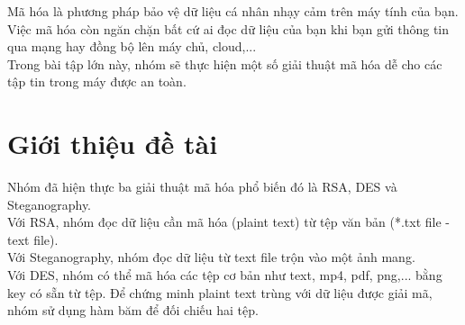 \documentclass[a4paper]{article}
\begin{document}

\newpage
\tableofcontents
\newpage

Mã hóa là phương pháp bảo vệ dữ liệu cá nhân nhạy cảm trên máy tính của bạn. Việc mã hóa còn ngăn chặn bất cứ ai đọc dữ liệu của bạn khi bạn gửi thông tin qua mạng hay đồng bộ lên máy chủ, cloud,...\\

Trong bài tập lớn này, nhóm sẽ thực hiện một số giải thuật mã hóa dễ cho các tập tin trong máy được an toàn.

\section{Giới thiệu đề tài}
Nhóm đã hiện thực ba giải thuật mã hóa phổ biến đó là RSA, DES và Steganography.\\

Với RSA, nhóm đọc dữ liệu cần mã hóa (plaint text) từ tệp văn bản (*.txt file - text file).\\
Với Steganography, nhóm đọc dữ liệu từ text file trộn vào một ảnh mang.\\
Với DES, nhóm có thể mã hóa các tệp cơ bản như text, mp4, pdf, png,... bằng key có sẵn từ tệp.
Để chứng minh plaint text trùng với dữ liệu được giải mã, nhóm sử dụng hàm băm để đối chiếu hai tệp.

\end{document}
